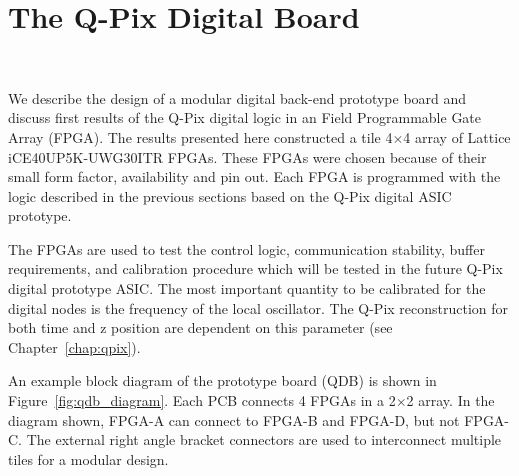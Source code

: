 \section{The Q-Pix Digital Board}~\label{sec:qdb_prototype}

We describe the design of a modular digital back-end prototype board and discuss first results of the Q-Pix digital logic in an Field Programmable Gate Array (FPGA).
The results presented here constructed a tile 4$\times$4 array of Lattice iCE40UP5K-UWG30ITR FPGAs.
These FPGAs were chosen because of their small form factor, availability and pin out.
Each FPGA is programmed with the logic described in the previous sections based on the Q-Pix digital ASIC prototype.

The FPGAs are used to test the control logic, communication stability, buffer requirements, and calibration procedure which will be tested in the future Q-Pix digital prototype ASIC.
The most important quantity to be calibrated for the digital nodes is the frequency of the local oscillator.
The Q-Pix reconstruction for both time and z position are dependent on this parameter (see Chapter~\ref{chap:qpix}).

An example block diagram of the prototype board (QDB) is shown in Figure~\ref{fig:qdb_diagram}.
Each PCB connects 4 FPGAs in a 2$\times$2 array.
In the diagram shown, FPGA-A can connect to FPGA-B and FPGA-D, but not FPGA-C.
The external right angle bracket connectors are used to interconnect multiple tiles for a modular design.


